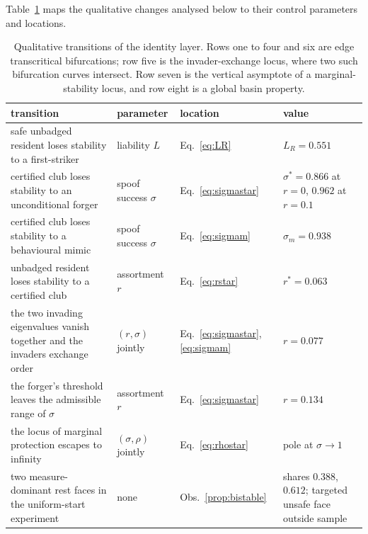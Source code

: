 
Table~\ref{tab:bifurcations} maps the qualitative changes analysed below to
their control parameters and locations.

\begin{table}[t]
\centering
\caption{Qualitative transitions of the identity layer. Rows one to four and
six are edge transcritical bifurcations; row five is the invader-exchange
locus, where two such bifurcation curves intersect. Row seven is the vertical
asymptote of a marginal-stability locus, and row eight is a global basin
property.}
\label{tab:bifurcations}
\small
\vspace{2pt}
\begin{tabular}{@{}p{5.6cm}p{2.2cm}lp{3.6cm}@{}}
\toprule
transition & parameter & location & value \\
\midrule
safe unbadged resident loses stability to a first-striker
  & liability $L$
  & Eq.~\eqref{eq:LR}
  & $L_R = 0.551$ \\[2pt]
certified club loses stability to an unconditional forger
  & spoof success $\sigma$
  & Eq.~\eqref{eq:sigmastar}
  & $\sigma^{*} = 0.866$ at $r = 0$, $0.962$ at $r = 0.1$ \\[2pt]
certified club loses stability to a behavioural mimic
  & spoof success $\sigma$
  & Eq.~\eqref{eq:sigmam}
  & $\sigma_m = 0.938$ \\[2pt]
unbadged resident loses stability to a certified club
  & assortment $r$
  & Eq.~\eqref{eq:rstar}
  & $r^{*} = 0.063$ \\[2pt]
the two invading eigenvalues vanish together and the invaders exchange order
  & $(r, \sigma)$ jointly
  & Eq.~\eqref{eq:sigmastar}, \eqref{eq:sigmam}
  & $r = 0.077$ \\[2pt]
the forger's threshold leaves the admissible range of $\sigma$
  & assortment $r$
  & Eq.~\eqref{eq:sigmastar}
  & $r = 0.134$ \\[2pt]
the locus of marginal protection escapes to infinity
  & $(\sigma, \rho)$ jointly
  & Eq.~\eqref{eq:rhostar}
  & pole at $\sigma \to 1$ \\[2pt]
two measure-dominant rest faces in the uniform-start experiment
  & none
  & Obs.~\ref{prop:bistable}
  & shares $0.388$, $0.612$; targeted unsafe face outside sample \\
\bottomrule
\end{tabular}
\end{table}

